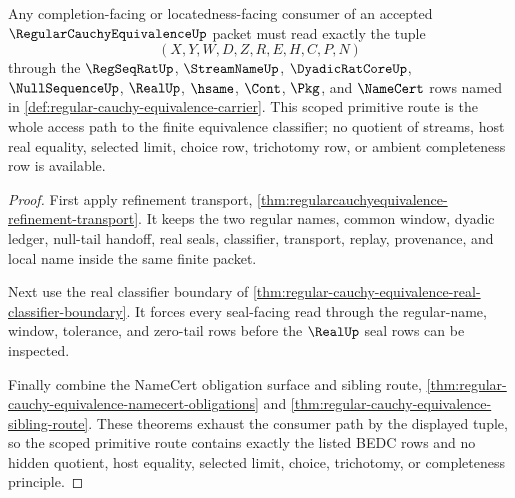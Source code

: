 \begin{theorem}
\label{thm:regular-cauchy-equivalence-scoped-primitive-route}
Any completion-facing or locatedness-facing consumer of an accepted $\RegularCauchyEquivalenceUp$ packet must read exactly the tuple
$$
(X,Y,W,D,Z,R,E,H,C,P,N)
$$
through the $\RegSeqRatUp$, $\StreamNameUp$, $\DyadicRatCoreUp$, $\NullSequenceUp$, $\RealUp$, $\hsame$, $\Cont$, $\Pkg$, and $\NameCert$ rows named in \autoref{def:regular-cauchy-equivalence-carrier}. This scoped primitive route is the whole access path to the finite equivalence classifier; no quotient of streams, host real equality, selected limit, choice row, trichotomy row, or ambient completeness row is available.
\end{theorem}
\begin{proof}
First apply refinement transport, \autoref{thm:regularcauchyequivalence-refinement-transport}. It keeps the two regular names, common window, dyadic ledger, null-tail handoff, real seals, classifier, transport, replay, provenance, and local name inside the same finite packet.

Next use the real classifier boundary of \autoref{thm:regular-cauchy-equivalence-real-classifier-boundary}. It forces every seal-facing read through the regular-name, window, tolerance, and zero-tail rows before the $\RealUp$ seal rows can be inspected.

Finally combine the NameCert obligation surface and sibling route, \autoref{thm:regular-cauchy-equivalence-namecert-obligations} and \autoref{thm:regular-cauchy-equivalence-sibling-route}. These theorems exhaust the consumer path by the displayed tuple, so the scoped primitive route contains exactly the listed BEDC rows and no hidden quotient, host equality, selected limit, choice, trichotomy, or completeness principle.
\end{proof}

